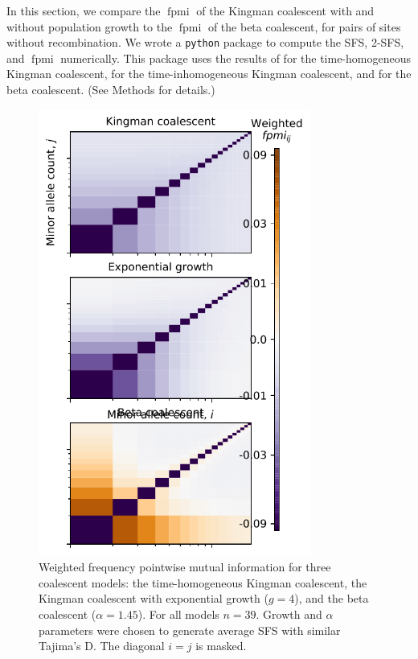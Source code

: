 \documentclass[11pt, letterpaper]{article}   	%
\DeclareMathOperator{\fpmi}{fpmi}
\begin{document}
In this section, we compare the $\fpmi$ of the Kingman coalescent with and without population growth to the $\fpmi$ of the beta coalescent, for pairs of sites without recombination.
We wrote a \texttt{python} package to compute the SFS, 2-SFS, and $\fpmi$ numerically.
This package uses the results of \cite{Fu1995} for the time-homogeneous Kingman coalescent, \cite{ZivkovicWiehe2008} for the time-inhomogeneous Kingman coalescent, and \cite{BirknerEtAl2013} for the beta coalescent.
(See Methods for details.)

\begin{figure}
\centering
\includegraphics[width=0.8\textwidth]{figures/figure1.pdf}
\caption{Weighted frequency pointwise mutual information for three coalescent models: the time-homogeneous Kingman coalescent, the Kingman coalescent with exponential growth ($g=4$), and the beta coalescent ($\alpha=1.45$). For all models $n=39$. Growth and $\alpha$ parameters were chosen to generate average SFS with similar Tajima's D. The diagonal $i=j$ is masked. \label{fig:nonrecombining_pmi}}
\end{figure}
\end{document}
